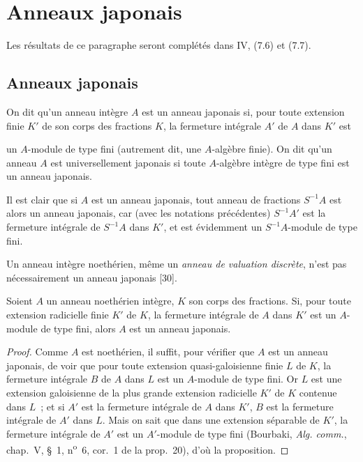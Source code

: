 \section{Anneaux japonais}
\label{section:0.23-fr}

Les résultats de ce paragraphe seront complétés dans IV, (7.6) et (7.7).

\subsection{Anneaux japonais}
\label{subsection:0.23.1-fr}

\begin{definition}[23.1.1]
\label{0.23.1.1-fr}
On dit qu'un anneau intègre $A$ est un anneau japonais si, pour toute
extension finie $K'$ de son corps des fractions $K$, la fermeture intégrale
$A'$ de $A$ dans $K'$ est


un $A$-module de type fini (autrement dit, une $A$-algèbre finie). On dit
qu'un anneau $A$ est universellement japonais si toute $A$-algèbre intègre de
type fini est un anneau japonais.
\end{definition}

Il est clair que si $A$ est un anneau japonais, tout anneau de fractions
$S^{-1}A$ est alors un anneau japonais, car (avec les notations précédentes)
$S^{-1}A'$ est la fermeture intégrale de $S^{-1}A$ dans $K'$, et est
évidemment un $S^{-1}A$-module de type fini.

Un anneau intègre noethérien, même un \emph{anneau de valuation discrète},
n'est pas nécessairement un anneau japonais [30].

\begin{proposition}[23.1.2]
\label{0.23.1.2-fr}
Soient $A$ un anneau noethérien intègre, $K$ son corps des fractions. Si, pour
toute extension radicielle finie $K'$ de $K$, la fermeture intégrale de $A$
dans $K'$ est un $A$-module de type fini, alors $A$ est un anneau japonais.
\end{proposition}

\begin{proof}
Comme $A$ est noethérien, il suffit, pour vérifier que $A$ est un anneau
japonais, de voir que pour toute extension quasi-galoisienne finie $L$ de
$K$, la fermeture intégrale $B$ de $A$ dans $L$ est un $A$-module de type
fini. Or $L$ est une extension galoisienne de la plus grande extension
radicielle $K'$ de $K$ contenue dans $L$~; et si $A'$ est la fermeture
intégrale de $A$ dans $K'$, $B$ est la fermeture intégrale de $A'$ dans $L$.
Mais on sait que dans une extension séparable de $K'$, la fermeture intégrale
de $A'$ est un $A'$-module de type fini (Bourbaki, \emph{Alg. comm.},
chap.~V, §~1, n\textsuperscript{o}~6, cor.~1 de la prop.~20), d'où la
proposition.
\end{proof}

